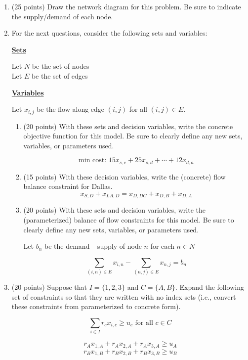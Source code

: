 \documentclass[letterpaper,oneside,12pt]{article}%
\newcommand{\blu}{\color{blue}}
\begin{document}
\begin{enumerate}
\item (25 points) Draw the network diagram for this problem. Be sure to indicate the supply/demand of each node. \newpage

\item For the next questions, consider the following sets and variables:

\textbf{\underline{Sets}} 

Let $N$ be the set of nodes \\
Let $E$ be the set of edges

\textbf{\underline{Variables}} 

Let $x_{i,j}$ be the flow along edge $(i,j)$ for all $(i,j) \in E$.

	\begin{enumerate}
	\item (20 points) With these sets and decision variables, write the concrete objective function for 
this model. Be sure to clearly define any new sets, variables, or parameters used. 

{\blu

\[
\text{min cost: } 15 x_{s,c} + 25 x_{s,d} + \cdots + 12 x_{d,a}
\]

}
	
	\item (15 points) With these decision variables, write the (concrete) flow balance constraint for Dallas. 
{
\blu
\[
x_{S,D} + x_{LA,D} = x_{D,DC} + x_{D,B} + x_{D,A}
\]
}
	
	\item (20 points) With these sets and decision variables, write the (parameterized) balance of flow 
constraints for this model. Be sure to clearly define any new sets, variables, or parameters used.  
{\blu

Let $b_n$ be the demand$-$ supply of node $n$ for each $n \in N$

\[
\sum_{(i,n) \in E} x_{i,n} - \sum_{(n,j) \in E} x_{n,j} = b_n
\]

}
	
	\end{enumerate}
\item (20 points) Suppose that $I = \{1,2,3\}$ and $C = \{A,B\}$. Expand the following set of constraints so that they are written with no index sets (i.e., convert these constraints from parameterized to concrete form).

\[
\sum_{i \in I} r_c x_{i,c} \geq u_c \text{ for all $c \in C$}
\]

{\blu

\[
r_A x_{1,A} + r_A x_{2,A} + r_A x_{3,A} \geq u_A
\]
\[
r_B x_{1,B} + r_B x_{2,B} + r_B x_{3,B} \geq u_B
\]

}

\end{enumerate}
\end{document}
